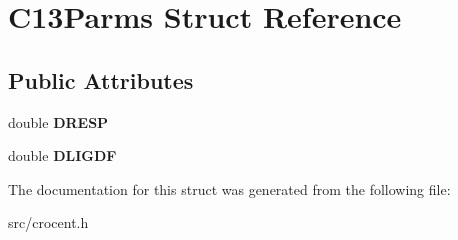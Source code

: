 \hypertarget{struct_c13_parms}{\section{C13\-Parms Struct Reference}
\label{struct_c13_parms}
}
\subsection*{Public Attributes}
\begin{DoxyCompactItemize}
\item 
\hypertarget{struct_c13_parms_a1f65df1c6bece52cb766188cb53c43d8}{double {\bfseries D\-R\-E\-S\-P}}\label{struct_c13_parms_a1f65df1c6bece52cb766188cb53c43d8}

\item 
\hypertarget{struct_c13_parms_ac020dbc1804a3d56d8ba53a2a20002a4}{double {\bfseries D\-L\-I\-G\-D\-F}}\label{struct_c13_parms_ac020dbc1804a3d56d8ba53a2a20002a4}

\end{DoxyCompactItemize}


The documentation for this struct was generated from the following file\-:\begin{DoxyCompactItemize}
\item 
src/crocent.\-h\end{DoxyCompactItemize}
